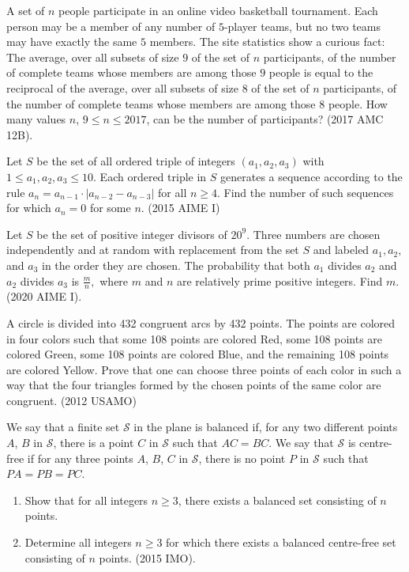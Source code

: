 \documentclass[11pt]{article}
\begin{document}
\begin{problem}[HM35]
    A set of $n$ people participate in an online video basketball tournament. Each person may be a member of any number of $5$-player teams, but no two teams may have exactly the same $5$ members. The site statistics show a curious fact: The average, over all subsets of size $9$ of the set of $n$ participants, of the number of complete teams whose members are among those $9$ people is equal to the reciprocal of the average, over all subsets of size $8$ of the set of $n$ participants, of the number of complete teams whose members are among those $8$ people. How many values $n$, $9\leq n\leq 2017$, can be the number of participants? (2017 AMC 12B).
\end{problem}
\begin{problem}[40]
    Let $S$ be the set of all ordered triple of integers $(a_1,a_2,a_3)$ with $1 \le a_1,a_2,a_3 \le 10$. Each ordered triple in $S$ generates a sequence according to the rule $a_n=a_{n-1}\cdot | a_{n-2}-a_{n-3} |$ for all $n\ge 4$. Find the number of such sequences for which $a_n=0$ for some $n$. (2015 AIME I)
\end{problem}
\begin{problem}[HM40]
    Let $S$ be the set of positive integer divisors of $20^9.$ Three numbers are chosen independently and at random with replacement from the set $S$ and labeled $a_1,a_2,$ and $a_3$ in the order they are chosen. The probability that both $a_1$ divides $a_2$ and $a_2$ divides $a_3$ is $\tfrac{m}{n},$ where $m$ and $n$ are relatively prime positive integers. Find $m.$ (2020 AIME I).
\end{problem}
\begin{problem}[40]
    A circle is divided into 432 congruent arcs by 432 points. The points are colored in four colors such that some 108 points are colored Red, some 108 points are colored Green, some 108 points are colored Blue, and the remaining 108 points are colored Yellow. Prove that one can choose three points of each color in such a way that the four triangles formed by the chosen points of the same color are congruent. (2012 USAMO)
\end{problem}
\begin{problem}[45]
    We say that a finite set $\mathcal{S}$ in the plane is balanced if, for any two different points $A$, $B$ in $\mathcal{S}$, there is a point $C$ in $\mathcal{S}$ such that $AC=BC$. We say that $\mathcal{S}$ is centre-free if for any three points $A$, $B$, $C$ in $\mathcal{S}$, there is no point $P$ in $\mathcal{S}$ such that $PA=PB=PC$.
\begin{enumerate}
    \item Show that for all integers $n\geq 3$, there exists a balanced set consisting of $n$ points.
    \item Determine all integers $n\geq 3$ for which there exists a balanced centre-free set consisting of $n$ points. (2015 IMO).
\end{enumerate}
\end{problem}
\end{document}
